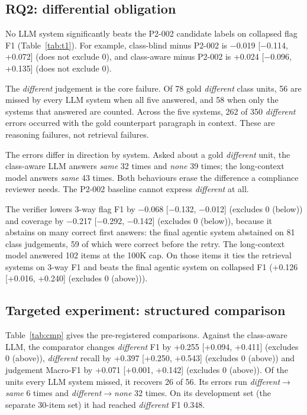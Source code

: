 \documentclass[conference]{IEEEtran}
\begin{document}


\subsection{RQ2: differential obligation}
No LLM system significantly beats the P2-002 candidate labels on collapsed flag F1 (Table~\ref{tab:t1}). For example, class-blind
minus P2-002 is $-$0.019 [$-$0.114, +0.072] (does not exclude 0), and class-aware minus P2-002 is
+0.024 [$-$0.096, +0.135] (does not exclude 0).

The \textit{different} judgement is the core failure. Of 78 gold \textit{different} class units,
56 are missed by every LLM system when all five answered, and 58
when only the systems that answered are counted. Across the five systems, 262 of 350 \textit{different} errors occurred with
the gold counterpart paragraph in context. These are reasoning failures, not retrieval failures.

The errors differ in direction by system. Asked about a gold \textit{different} unit, the class-aware LLM answers
\textit{same} 32 times and \textit{none} 39 times; the long-context
model answers \textit{same} 43 times. Both behaviours erase the difference a compliance
reviewer needs. The P2-002 baseline cannot express \textit{different} at all.

The verifier lowers 3-way flag F1 by $-$0.068 [$-$0.132, $-$0.012] (excludes 0 (below)) and coverage by
$-$0.217 [$-$0.292, $-$0.142] (excludes 0 (below)), because it abstains on many correct first answers: the final agentic system abstained on 81 class
judgements, 59 of which were correct before the retry. The
long-context model answered 102 items at the 100K cap. On those items it ties the retrieval
systems on 3-way F1 and beats the final agentic system on collapsed F1
(+0.126 [+0.016, +0.240] (excludes 0 (above))).



\subsection{Targeted experiment: structured comparison}
Table~\ref{tab:cmp} gives the pre-registered comparisons. Against the class-aware LLM, the comparator changes \textit{different} F1 by +0.255 [+0.094, +0.411] (excludes 0 (above)), \textit{different} recall by +0.397 [+0.250, +0.543] (excludes 0 (above)) and judgement Macro-F1 by +0.071 [+0.001, +0.142] (excludes 0 (above)). Of the units every LLM system missed, it recovers 26 of 56. Its errors run \textit{different}$\rightarrow$\textit{same} 6 times and \textit{different}$\rightarrow$\textit{none} 32 times. On its development set (the separate 30-item set) it had reached \textit{different} F1 0.348.
\end{document}
